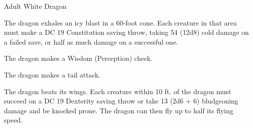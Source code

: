 \begin{monsterbox}{Adult White Dragon}
\begin{monsteraction}
\end{monsteraction}
\begin{monsteraction}
The dragon exhales an icy blast in a 60-foot cone. Each creature in that area must make a DC 19 Constitution saving throw, taking 54 (12d8) cold damage on a failed save, or half as much damage on a successful one.
\end{monsteraction}
\begin{monsteraction}[Detect]
The dragon makes a Wisdom (Perception) check.
\end{monsteraction}
\begin{monsteraction}
The dragon makes a tail attack.
\end{monsteraction}
\begin{monsteraction}
The dragon beats its wings. Each creature within 10 ft. of the dragon must succeed on a DC 19 Dexterity saving throw or take 13 (2d6 + 6) bludgeoning damage and be knocked prone. The dragon can then fly up to half its flying speed.
\end{monsteraction}
\end{monsterbox}